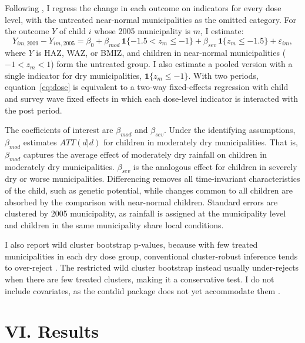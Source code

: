 \documentclass[12pt]{article}
\begin{document}
Following \textcite{callawayDifferenceinDifferencesContinuousTreatment2024}, I regress the change in each outcome on indicators for every dose level, with the untreated near-normal municipalities as the omitted category. For the outcome $Y$ of child $i$ whose 2005 municipality is $m$, I estimate:
\begin{equation}
Y_{im,2009} - Y_{im,2005} = \beta_0 + \beta_{mod}\,\mathbf{1}\{-1.5 < z_m \le -1\} + \beta_{sev}\,\mathbf{1}\{z_m \le -1.5\} + \varepsilon_{im}, \label{eq:dose}
\end{equation}
where $Y$ is HAZ, WAZ, or BMIZ, and children in near-normal municipalities ($-1 < z_m < 1$) form the untreated group. I also estimate a pooled version with a single indicator for dry municipalities, $\mathbf{1}\{z_m \le -1\}$. With two periods, equation~\eqref{eq:dose} is equivalent to a two-way fixed-effects regression with child and survey wave fixed effects in which each dose-level indicator is interacted with the post period.

The coefficients of interest are $\beta_{mod}$ and $\beta_{sev}$. Under the identifying assumptions, $\beta_{mod}$ estimates $ATT(d|d)$ for children in moderately dry municipalities. That is, $\beta_{mod}$ captures the average effect of moderately dry rainfall on children in moderately dry municipalities. $\beta_{sev}$ is the analogous effect for children in severely dry or worse municipalities. Differencing removes all time-invariant characteristics of the child, such as genetic potential, while changes common to all children are absorbed by the comparison with near-normal children. Standard errors are clustered by 2005 municipality, as rainfall is assigned at the municipality level and children in the same municipality share local conditions.

I also report wild cluster bootstrap p-values, because with few treated municipalities in each dry dose group, conventional cluster-robust inference tends to over-reject \parencite{mackinnonClusterrobustInferenceGuide2023}. The restricted wild cluster bootstrap instead usually under-rejects when there are few treated clusters, making it a conservative test. I do not include covariates, as the contdid package does not yet accommodate them \parencite{callawayDifferenceinDifferencesContinuousTreatment2026}.

\section*{VI. Results}\label{sec:VI}
\end{document}
